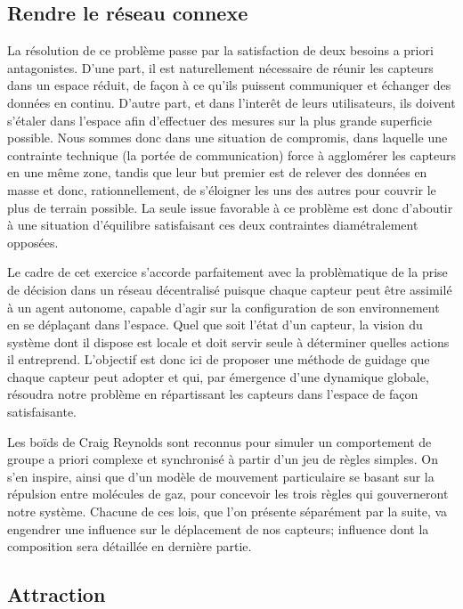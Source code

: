 \documentclass[10pt]{article}
\begin{document}
\begin{multicols}{2}

\section{Rendre le réseau connexe}

La résolution de ce problème passe par la satisfaction de deux besoins
a priori antagonistes. D'une part, il est naturellement nécessaire de
réunir les capteurs dans un espace réduit, de façon à ce qu'ils
puissent communiquer et échanger des données en continu. D'autre part,
et dans l'interêt de leurs utilisateurs, ils doivent s'étaler dans
l'espace afin d'effectuer des mesures sur la plus grande superficie
possible. Nous sommes donc dans une situation de compromis, dans
laquelle une contrainte technique (la portée de communication) force à
agglomérer les capteurs en une même zone, tandis que leur but premier
est de relever des données en masse et donc, rationnellement, de
s'éloigner les uns des autres pour couvrir le plus de terrain
possible. La seule issue favorable à ce problème est donc d'aboutir à
une situation d'équilibre satisfaisant ces deux contraintes
diamétralement opposées.

Le cadre de cet exercice s'accorde parfaitement avec la problèmatique
de la prise de décision dans un réseau décentralisé puisque chaque
capteur peut être assimilé à un agent autonome, capable d'agir sur la
configuration de son environnement en se déplaçant dans l'espace. Quel
que soit l'état d'un capteur, la vision du système dont il dispose est
locale et doit servir seule à déterminer quelles actions il
entreprend. L'objectif est donc ici de proposer une méthode de guidage
que chaque capteur peut adopter et qui, par émergence d'une dynamique
globale, résoudra notre problème en répartissant les capteurs dans
l'espace de façon satisfaisante.

Les boïds de Craig Reynolds \cite{Reynolds1987} sont reconnus pour
simuler un comportement de groupe a priori complexe et synchronisé à
partir d'un jeu de règles simples. On s'en inspire, ainsi que d'un
modèle de mouvement particulaire \cite{Cheng2011497} se basant sur la
répulsion entre molécules de gaz, pour concevoir les trois règles qui
gouverneront notre système. Chacune de ces lois, que l'on présente
séparément par la suite, va engendrer une influence sur le déplacement
de nos capteurs; influence dont la composition sera détaillée en
dernière partie.

\subsection*{Attraction}


\end{multicols}
\end{document}
